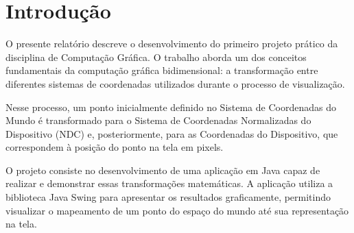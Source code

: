 \section{Introdução}
\label{sec:introducao}
O presente relatório descreve o desenvolvimento do primeiro projeto prático da disciplina de Computação Gráfica. O trabalho aborda um dos conceitos fundamentais da computação gráfica bidimensional: a transformação entre diferentes sistemas de coordenadas utilizados durante o processo de visualização.

Nesse processo, um ponto inicialmente definido no Sistema de Coordenadas do Mundo é transformado para o Sistema de Coordenadas Normalizadas do Dispositivo (NDC) e, posteriormente, para as Coordenadas do Dispositivo, que correspondem à posição do ponto na tela em pixels.

O projeto consiste no desenvolvimento de uma aplicação em Java capaz de realizar e demonstrar essas transformações matemáticas. A aplicação utiliza a biblioteca Java Swing para apresentar os resultados graficamente, permitindo visualizar o mapeamento de um ponto do espaço do mundo até sua representação na tela.
